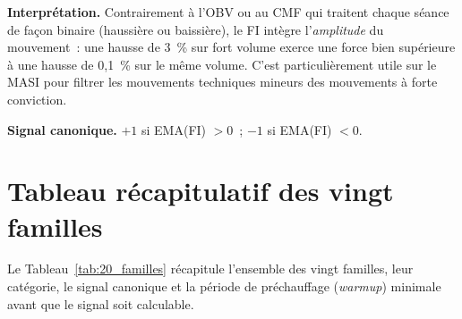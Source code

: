 \textbf{Interprétation.}
Contrairement à l'OBV ou au CMF qui traitent chaque séance de façon binaire (haussière
ou baissière), le FI intègre l'\textit{amplitude} du mouvement~: une hausse de 3~\% sur
fort volume exerce une force bien supérieure à une hausse de 0{,}1~\% sur le même volume.
C'est particulièrement utile sur le MASI pour filtrer les mouvements techniques mineurs
des mouvements à forte conviction.

\textbf{Signal canonique.} $+1$ si EMA(FI) $> 0$~; $-1$ si EMA(FI) $< 0$.

\section{Tableau récapitulatif des vingt familles}
\label{sec:at_tableau}

Le Tableau~\ref{tab:20_familles} récapitule l'ensemble des vingt familles, leur
catégorie, le signal canonique et la période de préchauffage (\textit{warmup})
minimale avant que le signal soit calculable.

